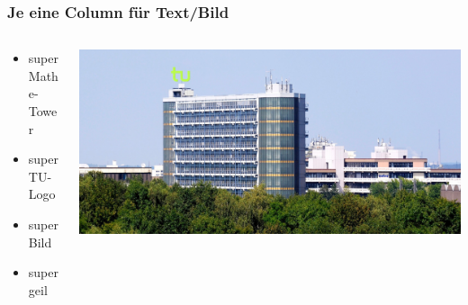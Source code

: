 \documentclass{beamer}
\begin{document}
\begin{frame}
    \frametitle{Je eine Column für Text/Bild}
    \begin{columns}[T]
        \begin{column}{0.5\textwidth}
            \begin{itemize}[<+->]
            \item super Mathe-Tower
            \item super TU-Logo
            \item super Bild
            \item super geil
        \end{itemize}
        \end{column}
        \begin{column}{0.5\textwidth}
            \includegraphics[width=\textwidth]{./Title-Pic.jpg}
        \end{column}
    \end{columns}
\end{frame}
\end{document}
